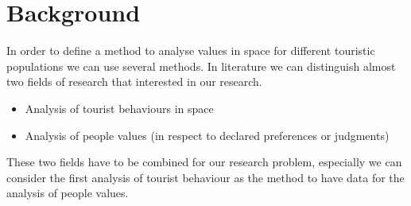 \documentclass[a4paper]{article}
\begin{document}
\section{Background}
In order to define a method to analyse values in space for different touristic populations we can use several methods. In literature we can distinguish almost two fields of research that interested in our research.
\begin{itemize}
    \item {Analysis of tourist behaviours in space}
    \item {Analysis of people values (in respect to declared preferences or judgments)}
\end{itemize}
These two fields have to be combined for our research problem, especially we can consider the first analysis of tourist behaviour as the method to have data  for the analysis of people values.
\end{document}
